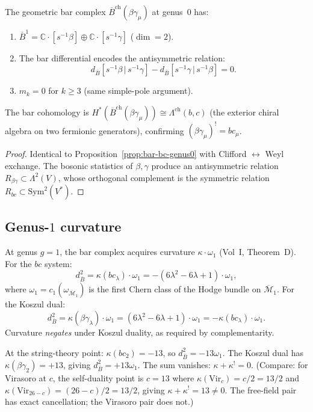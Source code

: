 \documentclass[11pt]{article}
\newcommand{\cM}{\mathcal{M}}
\newcommand{\barB}{\overline{B}}
\newcommand{\C}{\mathbb{C}}
\begin{document}
\begin{proposition}
\label{prop:bar-bg-genus0}
The geometric bar complex $\barB^{\mathrm{ch}}(\beta\gamma_\mu)$
at genus~$0$ has:
\begin{enumerate}
\item $\barB^1 = \C \cdot [s^{-1}\beta] \oplus \C \cdot
  [s^{-1}\gamma]$ ($\dim = 2$).
\item The bar differential encodes the antisymmetric relation:
  \[
  d_{\barB}[s^{-1}\beta \,|\, s^{-1}\gamma]
  - d_{\barB}[s^{-1}\gamma \,|\, s^{-1}\beta] = 0.
  \]
\item $m_k = 0$ for $k \ge 3$ (same simple-pole argument).
\end{enumerate}
The bar cohomology is
$H^*(\barB^{\mathrm{ch}}(\beta\gamma_\mu))
\cong \Lambda^{\mathrm{ch}}(b, c)$
(the exterior chiral algebra on two fermionic generators),
confirming $(\beta\gamma_\mu)^! = bc_\mu$.
\end{proposition}

\begin{proof}
Identical to Proposition~\ref{prop:bar-bc-genus0} with
Clifford $\leftrightarrow$ Weyl exchange.  The bosonic
statistics of $\beta, \gamma$ produce an antisymmetric
relation $R_{\beta\gamma} \subset \Lambda^2(V)$, whose
orthogonal complement is the symmetric relation
$R_{bc} \subset \mathrm{Sym}^2(V^*)$.
\end{proof}


\subsection{Genus-$1$ curvature}

At genus $g = 1$, the bar complex acquires curvature
$\kappa \cdot \omega_1$ (Vol~I, Theorem~D).  For the $bc$
system:
\begin{equation}\label{eq:bc-curvature-g1}
d_{\barB}^2 = \kappa(bc_\lambda) \cdot \omega_1
= -(6\lambda^2 - 6\lambda + 1) \cdot \omega_1,
\end{equation}
where $\omega_1 = c_1(\omega_{\overline{\cM}_1})$ is the first
Chern class of the Hodge bundle on $\overline{\cM}_1$.  For
the Koszul dual:
\[
d_{\barB}^2 = \kappa(\beta\gamma_\lambda) \cdot \omega_1
= (6\lambda^2 - 6\lambda + 1) \cdot \omega_1
= -\kappa(bc_\lambda) \cdot \omega_1.
\]
Curvature \emph{negates} under Koszul duality, as required by
complementarity.

At the string-theory point: $\kappa(bc_2) = -13$, so
$d_{\barB}^2 = -13\omega_1$.  The Koszul dual has
$\kappa(\beta\gamma_2) = +13$, giving $d_{\barB}^2
= +13\omega_1$.  The sum vanishes:
$\kappa + \kappa^! = 0$.  (Compare: for Virasoro at $c$,
the self-duality point is $c = 13$ where
$\kappa(\mathrm{Vir}_c) = c/2 = 13/2$ and
$\kappa(\mathrm{Vir}_{26-c}) = (26{-}c)/2 = 13/2$,
giving $\kappa + \kappa^! = 13 \neq 0$.
The free-field pair has exact cancellation; the
Virasoro pair does not.)
\end{document}
